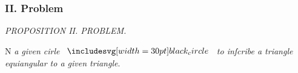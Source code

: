 \documentclass[12pt,preview]{standalone}
\begin{document}
\subsubsection{II. Problem}

\begin{minipage}[t]{0.33\textwidth}
    \vspace{40pt}
    
\end{minipage}%
\hfill
\begin{minipage}[t]{0.64\textwidth}
    \vspace{0pt}

    \begin{center}
        \textit{PROPOSITION II. PROBLEM.}\label{book4pr2} \\
    \end{center}

    \hfill

    \begin{center}
        \raggedright \lettrine[lines=4, loversize=1, nindent=0pt]{}{}N \textit{a given cirle} $\img[0][0][30]{black_circle}$ \textit{to inſcribe a triangle\\ equiangular to a given triangle}.
    \end{center}

    \hfill

    \hfill

    \hfill


\end{minipage}
\end{document}
